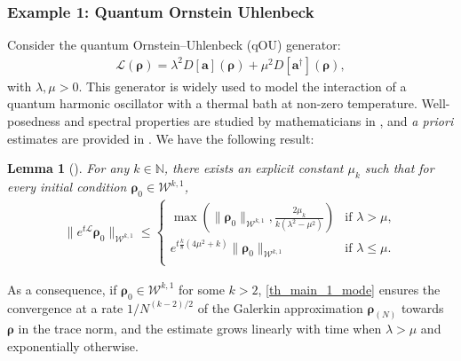 \documentclass{article}
\newtheorem{lemma}{Lemma}
\newcommand{\xL}{\mathcal{L}}
\newcommand{\xW}{\mathcal{W}}
\newcommand{\rN}{{\boldsymbol{\rho}_{(N)}}}
\let\bf\boldsymbol
\newcommand{\orho}{{\bf \rho}}
\newcommand{\oa}{{\bf a}}
\begin{document}
\subsubsection{Example 1: Quantum Ornstein Uhlenbeck}
Consider the quantum Ornstein--Uhlenbeck (qOU) generator:
\begin{align}
    \xL(\orho) = \lambda^2 D[\oa](\orho) + \mu^2 D[\oa^\dag](\orho),
\end{align}
with $\lambda, \mu > 0$. This generator is widely used to model the interaction of a quantum harmonic oscillator with a thermal bath at non-zero temperature. Well-posedness and spectral properties are studied by mathematicians in \cite{ciprianiSpectralAnalysisFeller2000,carboneHypercontractivityQuantumOrnstein2008}, and \textit{a priori} estimates are provided in \cite{gondolfEnergyPreservingEvolutions2024}. We have the following result:
\begin{lemma}[{\cite[Lemma 4.2]{gondolfEnergyPreservingEvolutions2024}}]
    For any $k \in \mathbb{N}$, there exists an explicit constant $\mu_k$ such that for every initial condition $\orho_0 \in \xW^{k,1}$,
    \begin{align}
        \| e^{t\xL} \orho_0 \|_{\xW^{k,1}} \leq \begin{cases}
            \max\left( \| \orho_0 \|_{\xW^{k,1}},  \frac{2 \mu_k}{k(\lambda^2-\mu^2 )} \right) & \text{if $\lambda > \mu$},\\
            e^{t\frac{k}{8}(4 \mu^2+k)}\| \orho_0 \|_{\xW^{k,1}} & \text{if $\lambda \leq \mu$}.\\
        \end{cases}
    \end{align}
\end{lemma}
As a consequence, if $\orho_0 \in \xW^{k,1}$ for some $k>2$, \cref{th_main_1_mode} ensures the convergence at a rate $1/N^{(k-2)/2}$ of the Galerkin approximation $\rN$ towards $\orho$ in the trace norm, and the estimate grows linearly with time when $\lambda > \mu$ and exponentially otherwise.
\end{document}
